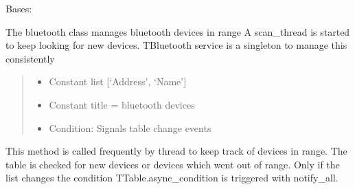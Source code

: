 \documentclass[letterpaper,10pt,english]{sphinxmanual}
\begin{document}
\begin{savenotes}\begin{fulllineitems}
\label{\detokenize{eezz:eezz.blueserv.TBluetooth}}
\pysigstartsignatures
{}
\pysigstopsignatures
\sphinxAtStartPar
Bases: 

\sphinxAtStartPar
The bluetooth class manages bluetooth devices in range
A scan\_thread is started to keep looking for new devices.
TBluetooth service is a singleton to manage this consistently
\begin{quote}\begin{description}
\begin{itemize}
\item {} 
\sphinxAtStartPar
{} \textendash{} Constant list {[}‘Address’, ‘Name’{]}

\item {} 
\sphinxAtStartPar
{} \textendash{} Constant title = bluetooth devices

\item {} 
\sphinxAtStartPar
{} \textendash{} Condition: Signals table change events

\end{itemize}

\end{description}\end{quote}

\begin{savenotes}\begin{fulllineitems}
\label{\detokenize{eezz:eezz.blueserv.TBluetooth.find_devices}}
\pysigstartsignatures
{}
\pysigstopsignatures
\sphinxAtStartPar
This method is called frequently by thread  to keep track of devices in range.
The table is checked for new devices or devices which went out of range. Only if the list changes the
condition TTable.async\_condition is triggered with notify\_all.


\end{fulllineitems}
\end{savenotes}
\end{fulllineitems}
\end{savenotes}
\end{document}
